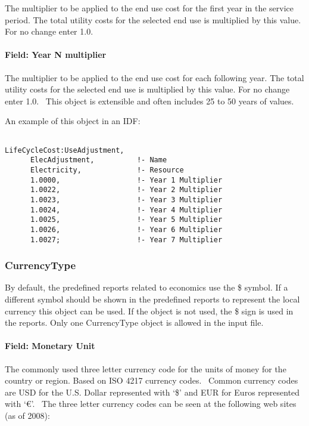 The multiplier to be applied to the end use cost for the first year in the service period. The total utility costs for the selected end use is multiplied by this value. For no change enter 1.0.

\paragraph{Field: Year N multiplier}\label{field-year-n-multiplier}

The multiplier to be applied to the end use cost for each following year. The total utility costs for the selected end use is multiplied by this value. For no change enter 1.0.~ This object is extensible and often includes 25 to 50 years of values.

An example of this object in an IDF:

\begin{lstlisting}

LifeCycleCost:UseAdjustment,
      ElecAdjustment,          !- Name
      Electricity,             !- Resource
      1.0000,                  !- Year 1 Multiplier
      1.0022,                  !- Year 2 Multiplier
      1.0023,                  !- Year 3 Multiplier
      1.0024,                  !- Year 4 Multiplier
      1.0025,                  !- Year 5 Multiplier
      1.0026,                  !- Year 6 Multiplier
      1.0027;                  !- Year 7 Multiplier
\end{lstlisting}

\subsubsection{CurrencyType}\label{currencytype}

By default, the predefined reports related to economics use the \$ symbol. If a different symbol should be shown in the predefined reports to represent the local currency this object can be used. If the object is not used, the \$ sign is used in the reports. Only one CurrencyType object is allowed in the input file.

\paragraph{Field: Monetary Unit}\label{field-monetary-unit}

The commonly used three letter currency code for the units of money for the country or region. Based on ISO 4217 currency codes.~ Common currency codes are USD for the U.S. Dollar represented with `\$' and EUR for Euros represented with `\euro{}'.~ The three letter currency codes can be seen at the following web sites (as of 2008):

